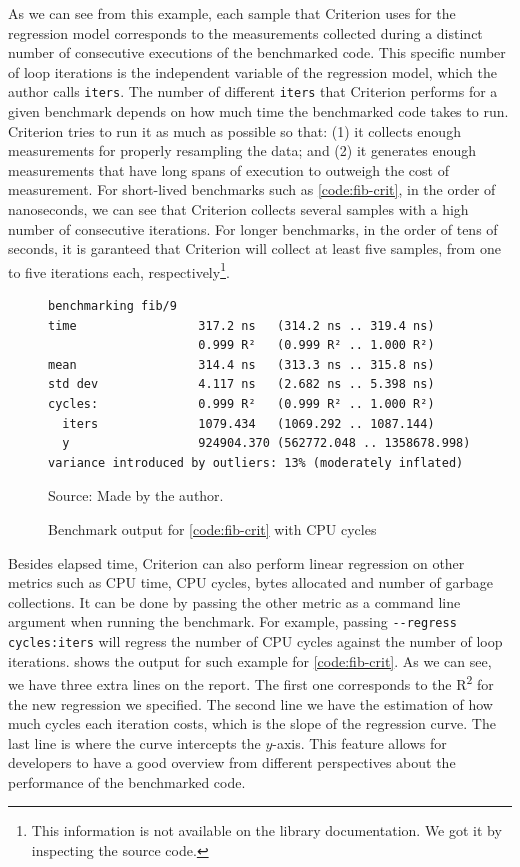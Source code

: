 As we can see from this example, each sample that Criterion uses for the regression model corresponds to the measurements collected during a distinct number of consecutive executions of the benchmarked code. This specific number of loop iterations is the independent variable of the regression model, which the author calls \texttt{iters}. The number of different \texttt{iters} that Criterion performs for a given benchmark depends on how much time the benchmarked code takes to run. Criterion tries to run it as much as possible so that: (1) it collects enough measurements for properly resampling the data; and (2) it generates enough measurements that have long spans of execution to outweigh the cost of measurement. For short-lived benchmarks such as \autoref{code:fib-crit}, in the order of nanoseconds, we can see that Criterion collects several samples with a high number of consecutive iterations. For longer benchmarks, in the order of tens of seconds, it is garanteed that Criterion will collect at least five samples, from one to five iterations each, respectively\footnote{This information is not available on the library documentation. We got it by inspecting the source code.}.

\begin{figure}[htp]
  \centering
  \caption{Benchmark output for \autoref{code:fib-crit} with CPU cycles}
  \begin{Verbatim}[fontsize=\small]
benchmarking fib/9
time                 317.2 ns   (314.2 ns .. 319.4 ns)
                     0.999 R²   (0.999 R² .. 1.000 R²)
mean                 314.4 ns   (313.3 ns .. 315.8 ns)
std dev              4.117 ns   (2.682 ns .. 5.398 ns)
cycles:              0.999 R²   (0.999 R² .. 1.000 R²)
  iters              1079.434   (1069.292 .. 1087.144)
  y                  924904.370 (562772.048 .. 1358678.998)
variance introduced by outliers: 13% (moderately inflated)
  \end{Verbatim}
  \footnotesize{Source: Made by the author.}
  \label{fig:fib-cycle-output}
\end{figure}

Besides elapsed time, Criterion can also perform linear regression on other metrics such as CPU time, CPU cycles, bytes allocated and number of garbage collections. It can be done by passing the other metric as a command line argument when running the benchmark. For example, passing \texttt{-{}-regress cycles:iters} will regress the number of CPU cycles against the number of loop iterations.  shows the output for such example for \autoref{code:fib-crit}. As we can see, we have three extra lines on the report. The first one corresponds to the R\textsuperscript{2} for the new regression we specified. The second line we have the estimation of how much cycles each iteration costs, which is the slope of the regression curve. The last line is where the curve intercepts the $y$-axis. This feature allows for developers to have a good overview from different perspectives about the performance of the benchmarked code.

